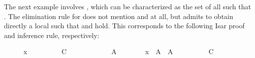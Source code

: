 \begin{isabellebody}
\begin{isamarkuptext}
  \medskip The next example involves \isa{{\isachardoublequote}{\isasymUnion}{\isasymA}{\isachardoublequote}}, which can be
  characterized as the set of all  such that .  The elimination rule for  does
  not mention \isa{{\isachardoublequote}{\isasymexists}{\isachardoublequote}} and \isa{{\isachardoublequote}{\isasymand}{\isachardoublequote}} at all, but admits to obtain
  directly a local  such that  and  hold.  This corresponds to the following Isar proof and
  inference rule, respectively:%
\end{isamarkuptext}%
\isamarkuptrue%
%
\medskip\begin{minipage}{0.6\textwidth}
%
\isadelimproof
%
\endisadelimproof
%
\isatagproof
\ \ \ \ \isamarkupfalse%
\ {\isachardoublequoteopen}x\ {\isasymin}\ {\isasymUnion}{\isasymA}{\isachardoublequoteclose}\isanewline
\ \ \ \ \isamarkupfalse%
\ \isamarkupfalse%
\ C\isanewline
\ \ \ \ \isamarkupfalse%
\isanewline
\ \ \ \ \ \ \isamarkupfalse%
\ A\isanewline
\ \ \ \ \ \ \isamarkupfalse%
\ {\isachardoublequoteopen}x\ {\isasymin}\ A{\isachardoublequoteclose}\ \ {\isachardoublequoteopen}A\ {\isasymin}\ {\isasymA}{\isachardoublequoteclose}\isanewline
\ \ \ \ \ \ \isamarkupfalse%
\ C%
\endisatagproof
{\isafoldproof}%
%
\isadelimproof
%
\endisadelimproof
%
\isadelimnoproof
\ %
\endisadelimnoproof
%
\isatagnoproof
{}\isamarkupfalse%
%
\endisatagnoproof
{\isafoldnoproof}%
%
\isadelimnoproof
\isanewline
%
\endisadelimnoproof
%
\isadelimproof
\ \ \ \ %
\endisadelimproof
%
\isatagproof
{}\isamarkupfalse%
%
\endisatagproof
{\isafoldproof}%
%
\isadelimproof
%
\endisadelimproof
%
\end{minipage}\begin{minipage}{0.4\textwidth}
%
\begin{isamarkuptext}%
%

\end{isamarkuptext}
\end{minipage}
\end{isabellebody}
